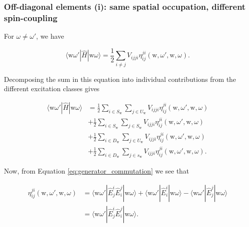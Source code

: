 \documentclass[12pt,a4paper]{report}
\begin{document}
\subsubsection{Off-diagonal elements (i): same spatial occupation, different spin-coupling}
For $\omega \ne \omega'$, we have

\begin{equation}\label{eq:hij_zero_segal}
  \langle \text{w} \omega' | \hat{H} | \text{w} \omega \rangle =
  \frac{1}{2} \sum_{i \ne j} V_{ijji}
  \eta_{ij}^{ji}(\text{w},\omega',\text{w},\omega).
\end{equation}

Decomposing the sum in this equation into individual contributions
from the different excitation classes gives

\begin{equation}
  \begin{aligned}
    \langle \text{w} \omega' | \hat{H} | \text{w} \omega \rangle &=
    \frac{1}{2} \sum_{i \in S_{\text{w}}} \sum_{j \in U_{\text{w}}}
    V_{ijji} \eta_{ij}^{ji}(\text{w},\omega',\text{w},\omega) \\
    &+ \frac{1}{2} \sum_{i \in S_{\text{w}}} \sum_{j \in S_{\text{w}}}
    V_{ijji} \eta_{ij}^{ji}(\text{w},\omega',\text{w},\omega) \\
    &+ \frac{1}{2} \sum_{i \in D_{\text{w}}} \sum_{j \in U_{\text{w}}}
    V_{ijji} \eta_{ij}^{ji}(\text{w},\omega',\text{w},\omega) \\
    &+ \frac{1}{2} \sum_{i \in D_{\text{w}}} \sum_{j \in s_{\text{w}}}
    V_{ijji} \eta_{ij}^{ji}(\text{w},\omega',\text{w},\omega).
  \end{aligned}
\end{equation}

Now, from Equation \ref{eq:generator_commutation} we see that

\begin{equation}
  \begin{aligned}
    \eta_{ij}^{ji}(\text{w},\omega',\text{w},\omega) &= \langle
    \text{w} \omega' | \hat{E}_{j}^{i} \hat{E}_{i}^{j} | \text{w}
    \omega \rangle + \langle \text{w} \omega' | \hat{E}_{i}^{i} |
    \text{w} \omega \rangle - \langle \text{w} \omega' |
    \hat{E}_{j}^{j} | \text{w} \omega \rangle \\
    &= \langle \text{w} \omega' | \hat{E}_{j}^{i} \hat{E}_{i}^{j} |
    \text{w} \omega \rangle.
  \end{aligned}
\end{equation}
\end{document}
